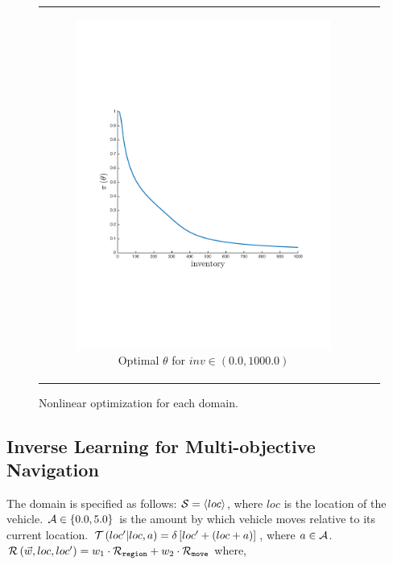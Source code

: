 {\begin{figure}[ht]
\begin{tabular}{cc}
            \begin{subfigure}{0.24\textwidth}\centering\includegraphics[width=\textwidth]{images/oe_opt_new}\caption{Optimal {\footnotesize $ \theta $} for {\footnotesize $ inv \in \left(0.0, 1000.0 \right) $}}\label{fig:oe_opt}\end{subfigure}&
            \\
        \end{tabular}
        \caption{Nonlinear optimization for each domain.}        
        \label{tab:opt_results}
    \end{figure}
}

\subsection{Inverse Learning for Multi-objective Navigation}
\label{sec:results_navigation}

The domain is specified as follows: {\footnotesize $ \mathcal{S} = \left\langle loc \right\rangle$}, where $ loc $ is the location of the vehicle. {\footnotesize $ \mathcal{A} \in \left\lbrace 0.0, 5.0 \right\rbrace $} is the amount by which vehicle moves relative to its current location. {\footnotesize $ \mathcal{T}\left( loc' | loc, a \right) = \delta \left[ loc' + (loc + a) \right] $}, where {\footnotesize $ a \in \mathcal{A} $}. {\footnotesize $ \mathcal{R}\left(\vec{w}, loc, loc'\right) = w_1 \cdot \mathcal{R}_{\mathtt{region}} + w_2 \cdot \mathcal{R}_{\mathtt{move}} $} where,

